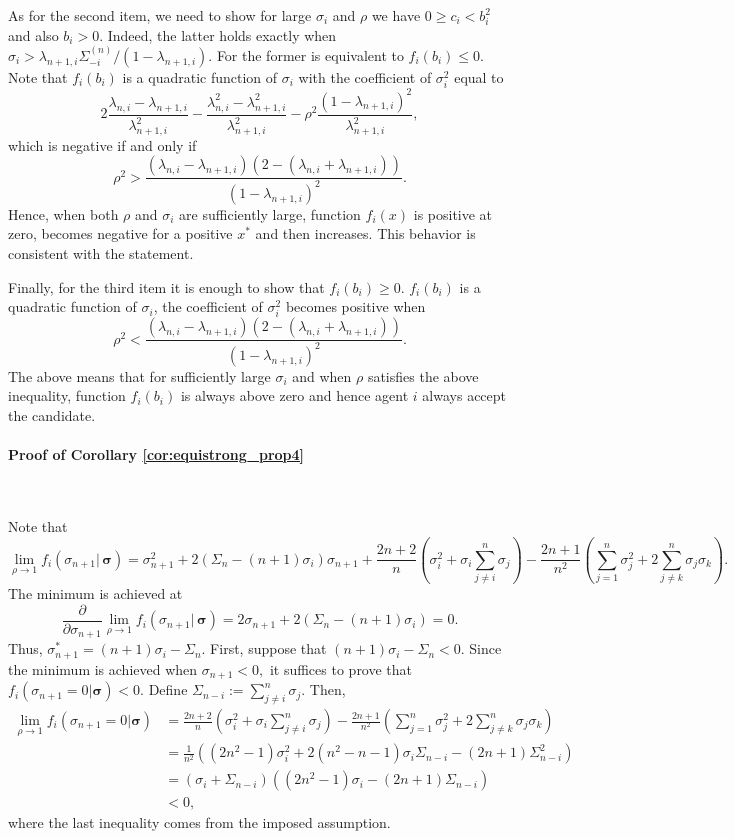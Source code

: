\documentclass[fleqn,mnsc,nonblindrev]{informs4}
\begin{document}
As for the second item, we need to show for large $\sigma_i$ and $\rho$ we have $0\geq c_i<b_i^2$ and also $b_i>0$. Indeed, the latter holds exactly when $\sigma_i>\lambda_{n+1,i}\Sigma_{-i}^{(n)}/(1-\lambda_{n+1,i})$. For the former is equivalent to $f_i(b_i)\leq 0$. Note that  
$f_i(b_i)$ is a quadratic function of $\sigma_i$ with the coefficient of $\sigma_i^2$ equal to 
\[2\frac{\lambda_{n,i}-\lambda_{n+1,i}}{\lambda_{n+1,i}^2}-\frac{\lambda^2_{n,i}-\lambda^2_{n+1,i}}{\lambda_{n+1,i}^2}-\rho^2\frac{(1-\lambda_{n+1,i})^2}{\lambda_{n+1,i}^2}, \]
which is negative if and only if 
\[\rho^2>\frac{(\lambda_{n,i}-\lambda_{n+1,i})(2-(\lambda_{n,i}+\lambda_{n+1,i}))}{(1-\lambda_{n+1,i})^2}.\]
Hence, when both $\rho$ and $\sigma_i$ are sufficiently large, function $f_i(x)$ is positive at zero, becomes negative for a positive $x^*$ and then increases. This behavior is consistent with the statement.  

Finally, for the third item it is enough to show that $f_i(b_i)\geq 0$. $f_i(b_i)$ is a quadratic function of $\sigma_i$, the coefficient of $\sigma_i^2$ becomes positive when 
\[\rho^2<\frac{(\lambda_{n,i}-\lambda_{n+1,i})(2-(\lambda_{n,i}+\lambda_{n+1,i}))}{(1-\lambda_{n+1,i})^2}.\]
The above means that for sufficiently large $\sigma_i$ and when $\rho$ satisfies the above inequality, function $f_i(b_i)$ is always above zero and hence agent $i$ always accept the candidate. 
\bigskip

\paragraph{Proof of Corollary \ref{cor:equistrong_prop4}}
\

Note that
{\small
\[
\lim_{\rho\to1}f_i(\sigma_{n+1}|\,\boldsymbol{\sigma})=\sigma_{n+1}^2+2\left(\Sigma_{n}-(n+1)\sigma_i\right)\sigma_{n+1}+\frac{2n+2}{n}\left(\sigma_i^2+\sigma_i\sum_{j\neq i}^{n}\sigma_j\right)-\frac{2n+1}{n^2}\left(\sum_{j=1}^n\sigma_j^2+2\sum_{j\neq k}^{n}\sigma_j\sigma_k\right).
\]
}
The minimum is achieved at
\[
\frac{\partial}{\partial \sigma_{n+1}} \lim_{\rho\to1}f_i(\sigma_{n+1}|\,\boldsymbol{\sigma})=2\sigma_{n+1}+2(\Sigma_{n}-(n+1)\sigma_i)=0.
\]
Thus, $\sigma_{n+1}^*=(n+1)\sigma_i-\Sigma_n.$ First, suppose that $(n+1)\sigma_i-\Sigma_n<0$. Since the minimum is achieved when $\sigma_{n+1}<0,$ it suffices to prove that $f_i(\sigma_{n+1}=0|\boldsymbol{\sigma})<0.$ Define $\Sigma_{n-i}:=\sum_{j\neq i}^n\sigma_j.$ Then,
\begin{align*}
\lim_{\rho\to1}f_i(\sigma_{n+1}=0|\boldsymbol{\sigma})&=\frac{2n+2}{n}\left(\sigma_i^2+\sigma_i\sum_{j\neq i}^{n}\sigma_j\right)-\frac{2n+1}{n^2}\left(\sum_{j=1}^n\sigma_j^2+2\sum_{j\neq k}^{n}\sigma_j\sigma_k\right)\\
&=\frac{1}{n^2}\left((2n^2-1)\sigma_i^2+2(n^2-n-1)\sigma_i\Sigma_{n-i}-(2n+1)\Sigma_{n-i}^2\right)\\
&=(\sigma_i+\Sigma_{n-i})((2n^2-1)\sigma_i-(2n+1)\Sigma_{n-i})\\
&<0,
\end{align*}
where the last inequality comes from the imposed assumption.
\end{document}
